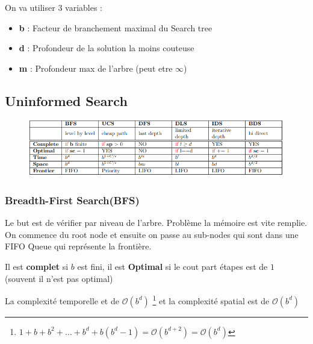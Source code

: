 			On va utiliser 3 variables :
			\begin{itemize}
				\item \textbf{b} : Facteur de branchement maximal du Search tree
				\item \textbf{d} : Profondeur de la solution la moins couteuse
				\item \textbf{m} : Profondeur max de l'arbre (peut etre $\infty$)
			\end{itemize}
	\subsection{Uninformed Search}
		\begin{figure}[htp]
			\centering
			\includegraphics[width=\textwidth]{img/UninformedSearch.png}
		\end{figure}
		\subsubsection{Breadth-First Search(BFS)}
			Le but est de vérifier par niveau de l'arbre. Problème la mémoire est vite remplie. On commence du root node et ensuite on passe au sub-nodes qui sont dans une FIFO Queue qui représente la frontière.
			
			Il est \textbf{complet} si $b$ est fini, il est \textbf{Optimal} si le cout part étapes est de $1$ (souvent il n'est pas optimal)
			
			La complexité temporelle et de $\mathcal{O}(b^d)$ \footnote{$1+b+b^2 + \dots + b^d + b(b^d - 1) = \mathcal{O}(b^{d+2}) = \mathcal{O}(b^d)$} et la complexité spatial est de $\mathcal{O}(b^d)$	
			
